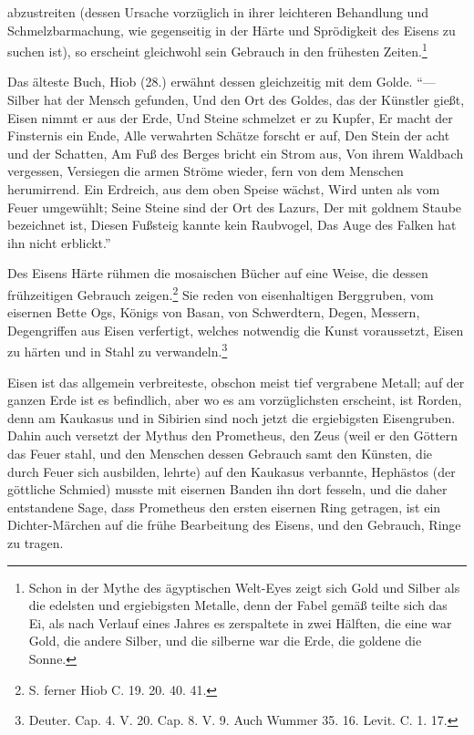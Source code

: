 \documentclass[a4paper, 11pt, oneside, polutonikogreek, german]{article}
\begin{document}
abzustreiten (dessen Ursache vorzüglich in ihrer leichteren Behandlung und Schmelzbarmachung, wie gegenseitig in der Härte und Sprödigkeit des Eisens zu suchen ist), so erscheint gleichwohl sein Gebrauch in den frühesten Zeiten.\footnote{Schon in der Mythe des ägyptischen Welt-Eyes zeigt sich Gold und Silber als die edelsten und ergiebigsten Metalle, denn der Fabel gemäß teilte sich das Ei, als nach Verlauf eines Jahres es zerspaltete in zwei Hälften, die eine war Gold, die andere Silber, und die silberne war die Erde, die goldene die Sonne.}

Das älteste Buch, Hiob (28.) erwähnt dessen gleichzeitig mit dem Golde. "`--- Silber hat der Mensch gefunden, Und den Ort des Goldes, das der Künstler gießt, Eisen nimmt er aus der Erde, Und Steine schmelzet er zu Kupfer, Er macht der Finsternis ein Ende, Alle verwahrten Schätze forscht er auf, Den Stein der acht und der Schatten, Am Fuß des Berges bricht ein Strom aus, Von ihrem Waldbach vergessen, Versiegen die armen Ströme wieder, fern von dem Menschen herumirrend. Ein Erdreich, aus dem oben Speise wächst, Wird unten als vom Feuer umgewühlt; Seine Steine sind der Ort des Lazurs, Der mit goldnem Staube bezeichnet ist, Diesen Fußsteig kannte kein Raubvogel, Das Auge des Falken hat ihn nicht erblickt."'

Des Eisens Härte rühmen die mosaischen Bücher auf eine Weise, die dessen frühzeitigen Gebrauch zeigen.\footnote{S. ferner Hiob C. 19. 20. 40. 41.} Sie reden von eisenhaltigen Berggruben, vom eisernen Bette Ogs, Königs von Basan, von Schwerdtern, Degen, Messern, Degengriffen aus Eisen verfertigt, welches notwendig die Kunst voraussetzt, Eisen zu härten und in Stahl zu verwandeln.\footnote{Deuter. Cap. 4. V. 20. Cap. 8. V. 9. Auch Wummer 35. 16. Levit. C. 1. 17.}

Eisen ist das allgemein verbreiteste, obschon meist tief vergrabene Metall; auf der ganzen Erde ist es befindlich, aber wo es am vorzüglichsten erscheint, ist Rorden, denn am Kaukasus und in Sibirien sind noch jetzt die ergiebigsten Eisengruben. Dahin auch versetzt der Mythus den Prometheus, den Zeus (weil er den Göttern das Feuer stahl, und den Menschen dessen Gebrauch samt den Künsten, die durch Feuer sich ausbilden, lehrte) auf den Kaukasus verbannte, Hephästos (der göttliche Schmied) musste mit eisernen Banden ihn dort fesseln, und die daher entstandene Sage, dass Prometheus den ersten eisernen Ring getragen, ist ein Dichter-Märchen auf die frühe Bearbeitung des Eisens, und den Gebrauch, Ringe zu tragen.
\end{document}
